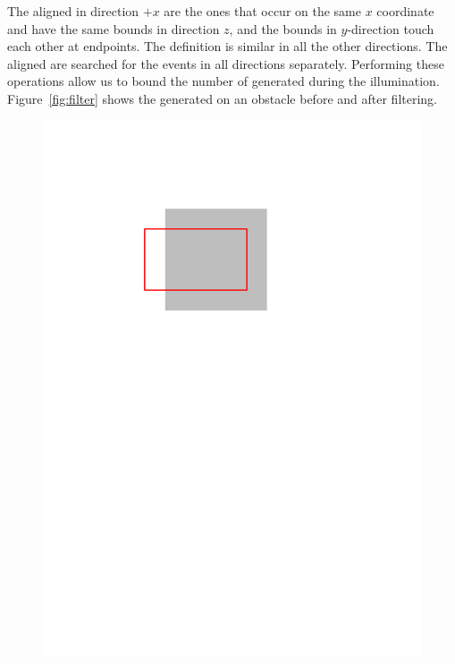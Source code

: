 \documentclass[english,gradu]{tktltiki2018}
\begin{document}
The aligned \addEs in direction $+x$ are the ones that occur on the same $x$ coordinate and have the same bounds in direction $z$, and the bounds in $y$-direction touch each other at endpoints.
The definition is similar in all the other directions.
The aligned \addEs are searched for the events in all directions separately.
Performing these operations allow us to bound the number of \addEs generated during the illumination.
Figure~\ref{fig:filter} shows the generated \addEs on an obstacle before and after filtering.

\begin{figure}\centering
	\includegraphics[scale=0.5,page=1]{fig/filter}
	\hfil

\end{figure}
\end{document}
